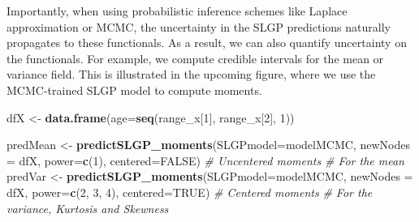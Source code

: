 \documentclass[
]{article}
\newenvironment{Shaded}{\begin{snugshade}}{\end{snugshade}}
\newcommand{\AttributeTok}[1]{\textcolor[rgb]{0.13,0.29,0.53}{#1}}
\newcommand{\CommentTok}[1]{\textcolor[rgb]{0.56,0.35,0.01}{\textit{#1}}}
\newcommand{\ConstantTok}[1]{\textcolor[rgb]{0.56,0.35,0.01}{#1}}
\newcommand{\DecValTok}[1]{\textcolor[rgb]{0.00,0.00,0.81}{#1}}
\newcommand{\FunctionTok}[1]{\textcolor[rgb]{0.13,0.29,0.53}{\textbf{#1}}}
\newcommand{\NormalTok}[1]{#1}
\newcommand{\OtherTok}[1]{\textcolor[rgb]{0.56,0.35,0.01}{#1}}
\begin{document}
Importantly, when using probabilistic inference schemes like Laplace approximation or MCMC, the uncertainty in the SLGP predictions naturally propagates to these functionals. As a result, we can also quantify uncertainty on the functionals. For example, we compute credible intervals for the mean or variance field. This is illustrated in the upcoming figure, where we use the MCMC-trained SLGP model to compute moments.

\begin{Shaded}
\begin{Highlighting}[]
\NormalTok{dfX }\OtherTok{\textless{}{-}} \FunctionTok{data.frame}\NormalTok{(}\AttributeTok{age=}\FunctionTok{seq}\NormalTok{(range\_x[}\DecValTok{1}\NormalTok{], range\_x[}\DecValTok{2}\NormalTok{], }\DecValTok{1}\NormalTok{))}

\NormalTok{predMean }\OtherTok{\textless{}{-}} \FunctionTok{predictSLGP\_moments}\NormalTok{(}\AttributeTok{SLGPmodel=}\NormalTok{modelMCMC,}
                                \AttributeTok{newNodes =}\NormalTok{ dfX, }
                                \AttributeTok{power=}\FunctionTok{c}\NormalTok{(}\DecValTok{1}\NormalTok{),}
                                \AttributeTok{centered=}\ConstantTok{FALSE}\NormalTok{) }\CommentTok{\# Uncentered moments}
\CommentTok{\# For the mean}
\NormalTok{predVar }\OtherTok{\textless{}{-}} \FunctionTok{predictSLGP\_moments}\NormalTok{(}\AttributeTok{SLGPmodel=}\NormalTok{modelMCMC,}
                               \AttributeTok{newNodes =}\NormalTok{ dfX, }
                               \AttributeTok{power=}\FunctionTok{c}\NormalTok{(}\DecValTok{2}\NormalTok{, }\DecValTok{3}\NormalTok{, }\DecValTok{4}\NormalTok{), }
                               \AttributeTok{centered=}\ConstantTok{TRUE}\NormalTok{) }\CommentTok{\# Centered moments}
\CommentTok{\# For the variance, Kurtosis and Skewness}


\end{Highlighting}
\end{Shaded}
\end{document}
